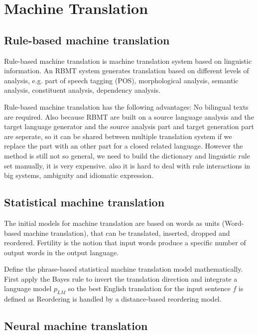 \chapter{Machine Translation}
\section{Rule-based machine translation}


Rule-based machine translation is machine translation system based on linguistic information. An RBMT system generates translation based on different levels of analysis, e.g. part of speech tagging (POS), morphological analysis,  semantic analysis, constituent analysis, dependency analysis.

Rule-based machine translation has the following advantages: No bilingual texts are required. Also because RBMT are built on a source language analysis and the target language generator and the source analysis part and target generation part are seperate, so it can be shared between multiple translation system if we replace the part with an other part for a closed related language.
However the method is still not so general, we need to build the dictionary and  linguistic rule set manually, it is very expensive. also it is hard to deal with rule interactions in big systems, ambiguity and idiomatic expression.




\section{Statistical machine translation}
The initial models for machine translation are based on words as units (Word-based machine translation), that can be translated, inserted, dropped and reordered.
Fertility is the notion that input words produce a specific number of output words in the output language.

Define the phrase-based statistical machine translation model mathematically.  First apply the Bayes rule to invert the translation direction and integrate a language model $p_{LM}$ so the best English translation for the input sentence ${f} $ is defined as 
Reordering is handled by a distance-based reordering model.
\section{Neural machine translation}
